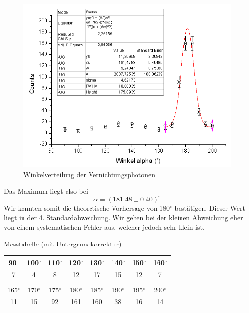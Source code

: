 \begin{figure}[H]
\centering \includegraphics[width = \textwidth]{auswertung/Winkel.png}
\caption{Winkelverteilung der Vernichtungsphotonen}
\end{figure}

Das Maximum liegt also bei
$$\alpha = (181.48 \pm 0.40)^\circ$$
Wir konnten somit die theoretische Vorhersage von 180$^\circ$ bestätigen. Dieser Wert liegt in der 4. Standardabweichung. Wir gehen bei der kleinen Abweichung eher von einem systematischen Fehler aus, welcher jedoch sehr klein ist.

Messtabelle (mit Untergrundkorrektur)

\begin{center}
\begin{tabular}{c c c c c c c c}
90$^\circ$ & 100$^\circ$ & 110$^\circ$ & 120$^\circ$ & 130$^\circ$ & 140$^\circ$ & 150$^\circ$ & 160$^\circ$\\ \hline
7 & 4 & 8 & 12 & 17 & 15 & 12 & 7 \\
& & & & & & & \\
165$^\circ$ & 170$^\circ$ & 175$^\circ$ & 180$^\circ$ & 185$^\circ$ & 190$^\circ$ & 195$^\circ$ & 200$^\circ$\\ \hline
11 & 15 & 92 & 161 & 160 & 38 & 16 & 14\\
\end{tabular}
\end{center}

























